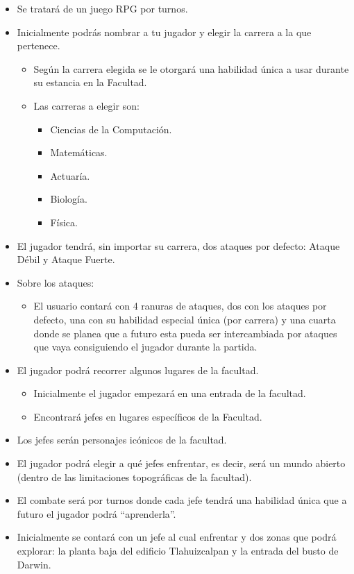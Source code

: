 \documentclass{article}
\begin{document}
\begin{itemize}
\item Se tratará de un juego RPG por turnos.
\item Inicialmente podrás nombrar a tu jugador y elegir la carrera a la que pertenece.
  \begin{itemize}
  \item Según la carrera elegida se le otorgará una
    habilidad única a usar durante su estancia en la Facultad.
  \item Las carreras a elegir son:
    \begin{itemize}
    \item Ciencias de la Computación.
    \item Matemáticas.
    \item Actuaría.
    \item Biología.
    \item Física.
    \end{itemize}
  \end{itemize}
\item El jugador tendrá, sin importar su carrera, dos ataques por defecto: Ataque Débil y Ataque Fuerte.
\item Sobre los ataques:
  \begin{itemize}
  \item El usuario contará con 4 ranuras de ataques, dos con los ataques por defecto, una con su habilidad
    especial única (por carrera) y una cuarta donde se planea que a futuro esta pueda ser intercambiada por
    ataques que vaya consiguiendo el jugador durante la partida.
  \end{itemize}
\item El jugador podrá recorrer algunos lugares de la facultad.
  \begin{itemize}
  \item Inicialmente el jugador empezará en una entrada de la facultad.
  \item Encontrará jefes en lugares específicos de la Facultad.
  \end{itemize}
\item Los jefes serán personajes icónicos de la facultad.
\item El jugador podrá elegir a qué jefes enfrentar, es decir, será un mundo abierto
  (dentro de las limitaciones topográficas de la facultad).
\item El combate será por turnos donde cada jefe tendrá una habilidad única que a
  futuro el jugador podrá “aprenderla”.
\item Inicialmente se contará con un jefe al cual enfrentar y dos zonas que podrá explorar:
  la planta baja del edificio Tlahuizcalpan y la entrada del busto de Darwin.
\end{itemize}
\end{document}
